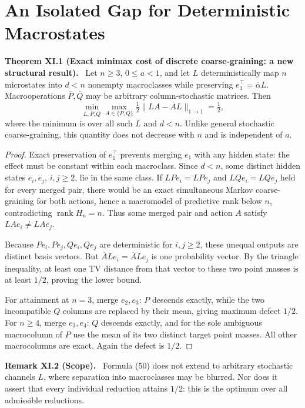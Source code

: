 \documentclass[11pt,a4paper,oneside]{book}
\DeclareMathOperator{\rank}{rank}\DeclareMathOperator{\Tr}{Tr}
\newcommand{\statement}[3]{\par\medskip\noindent\textbf{#1 #2 (#3).}\ }
\begin{document}
\chapter{An Isolated Gap for Deterministic Macrostates}
\statement{Theorem}{XI.1}{Exact minimax cost of discrete coarse-graining: a new structural result} Let $n\ge3$, $0\le a<1$, and let $L$ deterministically map $n$ microstates into $d<n$ nonempty macroclasses while preserving $e_1^\top=\overline\alpha L$. Macrooperations $\overline P,\overline Q$ may be arbitrary column-stochastic matrices. Then
\begin{equation}\min_{L,\overline P,\overline Q}\max_{A\in\{P,Q\}}\tfrac12\|LA-\overline AL\|_{1\to1}=\tfrac12,\tag{50}\end{equation}
where the minimum is over all such $L$ and $d<n$. Unlike general stochastic coarse-graining, this quantity does not decrease with $n$ and is independent of $a$.
\begin{proof}Exact preservation of $e_1^\top$ prevents merging $e_1$ with any hidden state: the effect must be constant within each macroclass. Since $d<n$, some distinct hidden states $e_i,e_j$, $i,j\ge2$, lie in the same class. If $LPe_i=LPe_j$ and $LQe_i=LQe_j$ held for every merged pair, there would be an exact simultaneous Markov coarse-graining for both actions, hence a macromodel of predictive rank below $n$, contradicting $\rank H_n=n$. Thus some merged pair and action $A$ satisfy $LAe_i\ne LAe_j$.

Because $Pe_i,Pe_j,Qe_i,Qe_j$ are deterministic for $i,j\ge2$, these unequal outputs are distinct basis vectors. But $\overline ALe_i=\overline ALe_j$ is one probability vector. By the triangle inequality, at least one TV distance from that vector to these two point masses is at least $1/2$, proving the lower bound.

For attainment at $n=3$, merge $e_2,e_3$: $P$ descends exactly, while the two incompatible $Q$ columns are replaced by their mean, giving maximum defect $1/2$. For $n\ge4$, merge $e_3,e_4$: $Q$ descends exactly, and for the sole ambiguous macrocolumn of $P$ use the mean of its two distinct target point masses. All other macrocolumns are exact. Again the defect is $1/2$.\end{proof}
\statement{Remark}{XI.2}{Scope} Formula (50) does not extend to arbitrary stochastic channels $L$, where separation into macroclasses may be blurred. Nor does it assert that every individual reduction attains $1/2$: this is the optimum over all admissible reductions.
\end{document}
